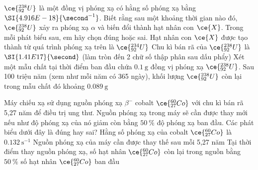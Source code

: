 \begin{ex}
	$\ce{_{92}^{238}U}$ là một đồng vị phóng xạ có hằng số phóng xạ bằng $\SI{4.916E-18}{\second^{-1}}$. Biết rằng sau một khoảng thời gian nào đó, $\ce{_{92}^{238}U}$ xảy ra phóng xạ $\alpha$ và biến đổi thành hạt nhân con $\ce{X }$. Trong mỗi phát biểu sau, em hãy chọn đúng hoặc sai.
	{Hạt nhân con $\ce{X}$ được tạo thành từ quá trình phóng xạ trên là $\ce{_{92}^{234}U}$}
	{\True Chu kì bán rã của $\ce{_{92}^{238}U}$ là $\SI{1.41E17}{\second}$ (làm tròn đến 2 chữ số thập phân sau dấu phẩy)}
	{Xét một mẫu chất tại thời điểm ban đầu chứa $\SI{0.1}{\gram}$ đồng vị phóng xạ $\ce{_{92}^{238}U}$. Sau 100 triệu năm (xem như mỗi năm có 365 ngày), khối lượng $\ce{_{92}^{238}U}$ còn lại trong mẫu chất đó khoảng $\SI{0.089}{\gram}$}
	\loigiai{}
\end{ex}
\begin{ex}
	Máy chiếu xạ sử dụng nguồn phóng xạ $\beta^{-}$ cobalt $\ce{_{27}^{60}Co}$ với chu kì bán rã 5,27 năm để điều trị ung thư. Nguồn phóng xạ trong máy sẽ cần được thay mới nếu như độ phóng xạ của nó giảm còn bằng $\SI{50}{\percent}$ độ phóng xạ ban đầu. Các phát biểu dưới đây là đúng hay sai?
	{Hằng số phóng xạ của cobalt $\ce{_{27}^{60}Co}$ là $\SI{0.132}{\second^{-1}}$}
	{\True Nguồn phóng xạ của máy cần được thay thế sau mỗi 5,27 năm}
	{\True Tại thời điểm thay nguồn phóng xạ, số hạt nhân $\ce{_{27}^{60}Co}$ còn lại trong nguồn bằng $\SI{50}{\percent}$ số hạt nhân $\ce{_{27}^{60}Co}$ ban đầu}
	\loigiai{}
\end{ex}
